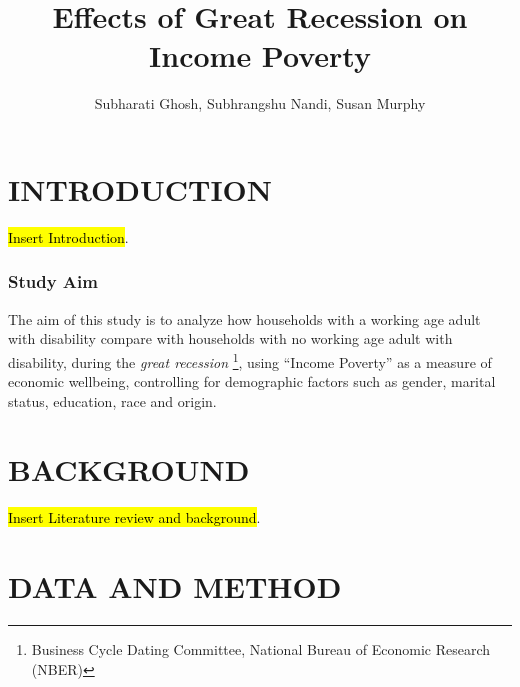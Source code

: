 \documentclass[11pt]{extarticle} %
\begin{document}
\doublespacing


\title{Effects of Great Recession on Income Poverty}
\author{Subharati Ghosh, Subhrangshu Nandi, Susan Murphy \\
\date{}
}

\maketitle
\section*{INTRODUCTION}
{\hl{Insert Introduction}}.

\subsubsection*{Study Aim}
The aim of this study is to analyze how households with a working age adult with disability compare with households with no working age adult with disability, during the {\emph{great recession}} \footnote{Business Cycle Dating Committee, National Bureau of Economic Research (NBER)}, using ``Income Poverty'' as a measure of economic wellbeing, controlling for demographic factors such as gender, marital status, education, race and origin. 

\section*{BACKGROUND}
{\hl{Insert Literature review and background}}.

\section*{DATA AND METHOD}
\end{document}
